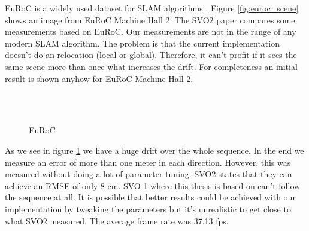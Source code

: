 \documentclass[11pt,a4paper,titlepage,oneside]{report}
\begin{document}
EuRoC is a widely used dataset for SLAM algorithms \cite{euroc}. Figure \ref{fig:euroc_scene} shows an image from EuRoC Machine Hall 2. The SVO2 paper \cite{svo2} compares some measurements based on EuRoC. Our measurements are not in the range of any modern SLAM algorithm. The problem is that the current implementation doesn't do an relocation (local or global). Therefore, it can't profit if it sees the same scene more than once what increases the drift. For completeness an initial result is shown anyhow for EuRoC Machine Hall 2.

\begin{figure}[H]
  \\
  \\
  \caption{EuRoC }\label{fig:euroc}
\end{figure}

As we see in figure \ref{fig:euroc} we have a huge drift over the whole sequence. In the end we measure an error of more than one meter in each direction. However, this was measured without doing a lot of parameter tuning. SVO2 states that they can achieve an RMSE of only 8 cm. SVO 1 where this thesis is based on can't follow the sequence at all. It is possible that better results could be achieved with our implementation by tweaking the parameters but it's unrealistic to get close to what SVO2 measured. The average frame rate was 37.13 fps.
\end{document}
